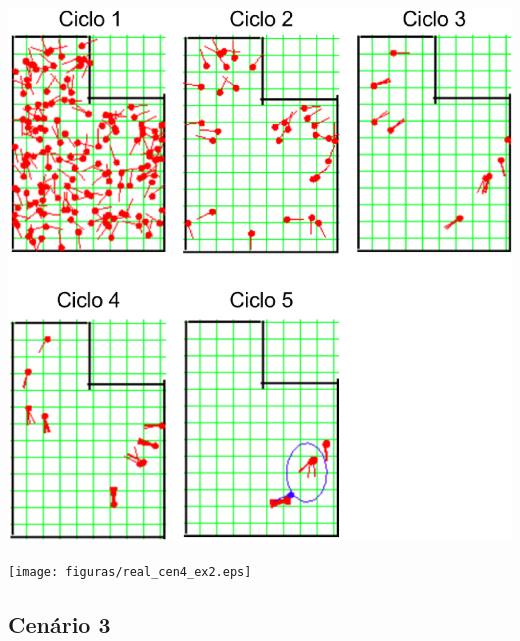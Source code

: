 {\centering
\includegraphics[scale=0.4]{figuras/cen4_ex2.eps}
\label{img:cen4_ex2}
\par}

{\centering
\texttt{[image: figuras/real\_cen4\_ex2.eps]}
\label{img:real_cen4_ex2}
\par}

\subsection{Cenário 3}

